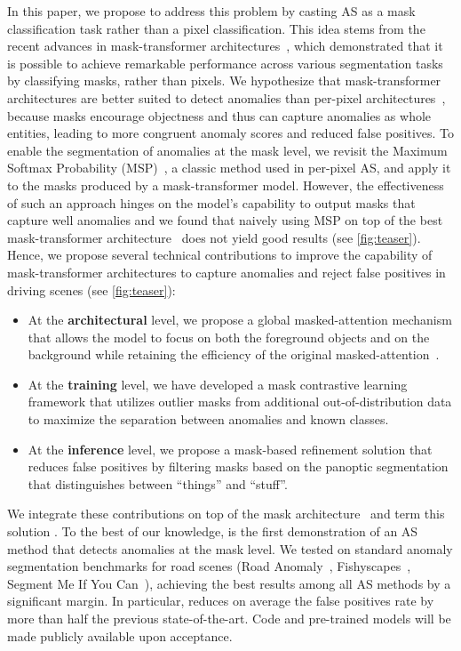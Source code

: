 \documentclass[10pt,twocolumn,letterpaper]{article}
\newcommand\our{\text{Mask2Anomaly}}
\begin{document}
In this paper, we propose to address this problem by casting AS  as a mask classification task rather than a pixel classification. This idea stems from the recent advances in mask-transformer architectures~\cite{cheng2022masked, cheng2021per}, which demonstrated that it is possible to achieve remarkable performance across various segmentation tasks by classifying masks, rather than pixels. We hypothesize that mask-transformer architectures are better suited to detect anomalies than per-pixel architectures~\cite{chen2018encoder,huang2017densely}, because masks encourage objectness and thus can capture anomalies as whole entities, leading to more congruent anomaly scores and reduced false positives. 
To enable the segmentation of anomalies at the mask level, we revisit the Maximum Softmax Probability (MSP)~\cite{hendrycks2016baseline}, a classic method used in per-pixel AS, and apply it to the masks produced by a mask-transformer model.
However, the effectiveness of such an approach hinges on the model's capability to output masks that capture well anomalies and we found that naively using MSP on top of the best mask-transformer architecture~\cite{cheng2022masked} does not yield good results (see \cref{fig:teaser}).
Hence, we propose several technical contributions to improve the capability of mask-transformer architectures to capture anomalies and reject false positives in driving scenes (see \cref{fig:teaser}): 
\begin{itemize}[noitemsep,topsep=0pt]
    \item At the \textbf{architectural} level, we propose a global masked-attention mechanism that allows the model to focus on both the foreground objects and on the background while retaining the efficiency of the original masked-attention~\cite{cheng2022masked}.
    \item At the \textbf{training} level, we have developed a mask contrastive learning framework that utilizes outlier masks from additional out-of-distribution data to maximize the separation between anomalies and known classes.
    \item At the \textbf{inference} level, we propose a mask-based refinement solution that reduces false positives by filtering masks based on the panoptic segmentation~\cite{kirillov2019panoptic} that distinguishes between ``things'' and ``stuff''.
\end{itemize}
We integrate these contributions on top of the mask architecture~\cite{cheng2022masked} and term this solution \textbf{\our}.
To the best of our knowledge, {\our} is the first demonstration of an AS method that detects anomalies at the mask level. We tested {\our} on standard anomaly segmentation benchmarks for road scenes (Road Anomaly~\cite{lis2019detecting}, Fishyscapes~\cite{blum2021fishyscapes},  Segment Me If You Can~\cite{chan2021segmentmeifyoucan}), achieving the best results among all AS methods by a significant margin. In particular, {\our} reduces on average the false positives rate by more than half \wrt the previous state-of-the-art. Code and pre-trained models will be made publicly available upon acceptance.
\end{document}
